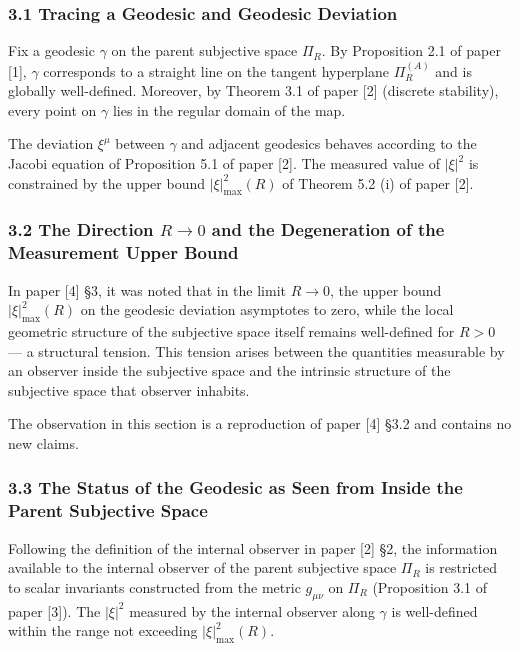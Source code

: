 \documentclass[a4paper,11pt]{article}
\theoremstyle{definition}
\begin{document}
\subsubsection{3.1 Tracing a Geodesic and Geodesic Deviation}\label{tracing-a-geodesic-and-geodesic-deviation}

Fix a geodesic \(\gamma\) on the parent subjective space \(\Pi_R\). By Proposition 2.1 of paper {[}1{]}, \(\gamma\) corresponds to a straight line on the tangent hyperplane \(\Pi^{(A)}_R\) and is globally well-defined. Moreover, by Theorem 3.1 of paper {[}2{]} (discrete stability), every point on \(\gamma\) lies in the regular domain of the map.

The deviation \(\xi^\mu\) between \(\gamma\) and adjacent geodesics behaves according to the Jacobi equation of Proposition 5.1 of paper {[}2{]}. The measured value of \(|\xi|^2\) is constrained by the upper bound \(|\xi|^2_{\max}(R)\) of Theorem 5.2 (i) of paper {[}2{]}.

\subsubsection{\texorpdfstring{3.2 The Direction \(R \to 0\) and the Degeneration of the Measurement Upper Bound}{3.2 The Direction R \textbackslash to 0 and the Degeneration of the Measurement Upper Bound}}\label{the-direction-r-to-0-and-the-degeneration-of-the-measurement-upper-bound}

In paper {[}4{]} §3, it was noted that in the limit \(R \to 0\), the upper bound \(|\xi|^2_{\max}(R)\) on the geodesic deviation asymptotes to zero, while the local geometric structure of the subjective space itself remains well-defined for \(R > 0\) --- a structural tension. This tension arises between the quantities measurable by an observer inside the subjective space and the intrinsic structure of the subjective space that observer inhabits.

The observation in this section is a reproduction of paper {[}4{]} §3.2 and contains no new claims.

\subsubsection{3.3 The Status of the Geodesic as Seen from Inside the Parent Subjective Space}\label{the-status-of-the-geodesic-as-seen-from-inside-the-parent-subjective-space}

Following the definition of the internal observer in paper {[}2{]} §2, the information available to the internal observer of the parent subjective space \(\Pi_R\) is restricted to scalar invariants constructed from the metric \(g_{\mu\nu}\) on \(\Pi_R\) (Proposition 3.1 of paper {[}3{]}). The \(|\xi|^2\) measured by the internal observer along \(\gamma\) is well-defined within the range not exceeding \(|\xi|^2_{\max}(R)\).
\end{document}
